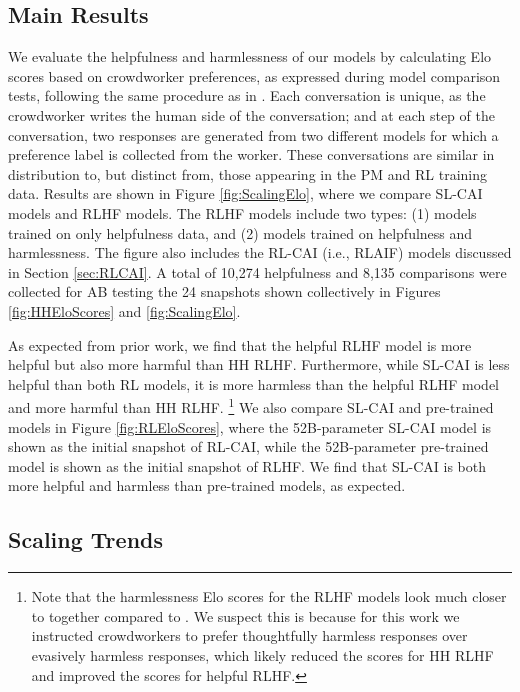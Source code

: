 \documentclass[english]{article}
\renewcommand\>{\rangle}
\begin{document}
\subsection{Main Results}
\label{sec:SLResults}

We evaluate the helpfulness and harmlessness of our models by calculating Elo scores based on crowdworker preferences, as expressed during model comparison tests, following the same procedure as in \cite{bai2022training}. Each conversation is unique, as the crowdworker writes the human side of the conversation; and at each step of the conversation, two responses are generated from two different models for which a preference label is collected from the worker. These conversations are similar in distribution to, but distinct from, those appearing in the PM and RL training data. Results are shown in Figure \ref{fig:ScalingElo}, where we compare SL-CAI models and RLHF models. The RLHF models include two types: (1) models trained on only helpfulness data, and (2) models trained on helpfulness and harmlessness. The figure also includes the RL-CAI (i.e., RLAIF) models discussed in Section \ref{sec:RLCAI}. A total of 10,274 helpfulness and 8,135 comparisons were collected for AB testing the 24 snapshots shown collectively in Figures \ref{fig:HHEloScores} and \ref{fig:ScalingElo}.


As expected from prior work, we find that the helpful RLHF model is more helpful but also more harmful than HH RLHF.  Furthermore, while SL-CAI is less helpful than both RL models, it is more harmless than the helpful RLHF model and more harmful than HH RLHF. \footnote{Note that the harmlessness Elo scores for the RLHF models look much closer to together compared to \cite{bai2022training}. We suspect this is because for this work we instructed crowdworkers to prefer thoughtfully harmless responses over evasively harmless responses, which likely reduced the scores for HH RLHF and improved the scores for helpful RLHF.}
We also compare SL-CAI and pre-trained models in Figure \ref{fig:RLEloScores}, where the 52B-parameter SL-CAI model is shown as the initial snapshot of RL-CAI, while the 52B-parameter pre-trained model is shown as the initial snapshot of RLHF. We find that SL-CAI is both more helpful and harmless than pre-trained models, as expected.

\subsection{Scaling Trends}
\end{document}
